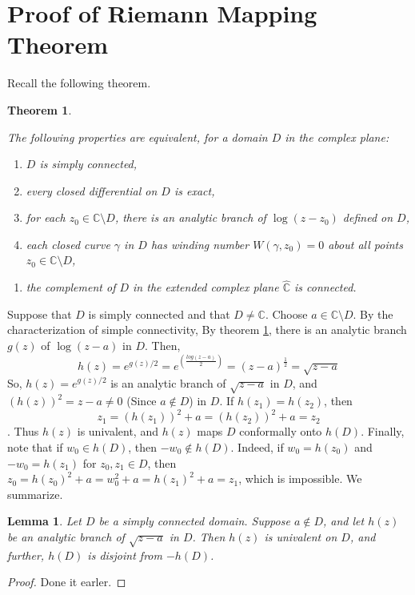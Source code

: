 \documentclass[
]{book}
\providecommand{\tightlist}{%
  \setlength{\itemsep}{0pt}\setlength{\parskip}{0pt}}
\newtheorem{theorem}{Theorem}[chapter]
\newtheorem{lemma}{Lemma}[chapter]
\theoremstyle{definition}
\theoremstyle{definition}
\theoremstyle{definition}
\theoremstyle{definition}
\theoremstyle{remark}
\begin{document}
\section{Proof of Riemann Mapping Theorem}\label{proof-of-riemann-mapping-theorem}

Recall the following theorem.

\begin{theorem}
\protect\hypertarget{thm:thm1}{}\label{thm:thm1}

The following properties are equivalent, for a domain \(D\) in the complex plane:

\begin{enumerate}
\def\labelenumi{\roman{enumi}.}
\tightlist
\item
  \(D\) is simply connected,
\item
  every closed differential on \(D\) is exact,
\item
  for each \(z_0 \in \mathbb{C} \setminus D\), there is an analytic branch of \(\log(z - z_0)\) defined
  on \(D\),
\item
  each closed curve \(\gamma\) in \(D\) has winding number \(W(\gamma, z_0) = 0\) about all points \(z_0 \in \mathbb{C} \setminus D\),
\end{enumerate}

\begin{enumerate}
\def\labelenumi{(\alph{enumi})}
\setcounter{enumi}{21}
\tightlist
\item
  the complement of \(D\) in the extended complex plane \(\hat{\mathbb{C}}\) is connected.
\end{enumerate}

\end{theorem}

Suppose that \(D\) is simply connected and that \(D \neq \mathbb{C}\). Choose \(a \in \mathbb{C} \setminus D\). By the characterization of simple connectivity,
By theorem \ref{thm:thm1}, there is an analytic branch \(g(z)\) of \(\log(z - a)\) in \(D\).
Then,
\[h(z) = e^{g(z)/2}=e^{\left(\frac{log(z-a)}{2}\right)}=(z-a)^{\frac{1}{2}}=\sqrt{z-a}\]
So, \(h(z) = e^{g(z)/2}\) is an analytic branch of \(\sqrt{z - a}\) in \(D\), and \((h(z))^2 = z - a \neq 0\) (Since \(a\not\in D\)) in \(D\). If \(h(z_1) = h(z_2)\), then \[z_1 = (h(z_1))^2 + a = (h(z_2))^2 + a = z_2\].
Thus \(h(z)\) is univalent, and \(h(z)\) maps \(D\) conformally onto \(h(D)\). Finally, note that if \(w_0 \in h(D)\), then \(-w_0 \notin h(D)\). Indeed, if \(w_0 = h(z_0)\) and \(-w_0 = h(z_1)\) for \(z_0, z_1 \in D\), then \(z_0 = h(z_0)^2 + a = w_0^2 + a = h(z_1)^2 + a = z_1\), which is impossible. We summarize.

\begin{lemma}
\protect\hypertarget{lem:unnamed-chunk-29}{}\label{lem:unnamed-chunk-29}Let \(D\) be a simply connected domain. Suppose \(a \notin D\), and let
\(h(z)\) be an analytic branch of \(\sqrt{z - a}\) in \(D\). Then \(h(z)\) is univalent on \(D\), and further, \(h(D)\) is disjoint from \(-h(D)\).
\end{lemma}

\begin{proof}
Done it earler.
\end{proof}

  
\end{document}
